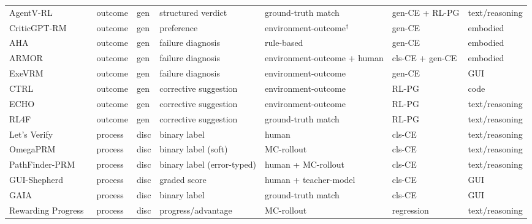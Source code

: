 \begin{table}[htbp]
{\begin{tabular}{@{}lllllll@{}}
AgentV-RL~\cite{Zha26ac}        & outcome & gen  & structured verdict        & ground-truth match                     & gen-CE + RL-PG  & text/reasoning  \\
CriticGPT-RM~\cite{Liu24g}      & outcome & gen  & preference                & environment-outcome$^\dagger$          & gen-CE          & embodied        \\
AHA~\cite{Dua24}                & outcome & gen  & failure diagnosis         & rule-based                             & gen-CE          & embodied        \\
ARMOR~\cite{Qi26}               & outcome & gen  & failure diagnosis         & environment-outcome + human            & cls-CE + gen-CE & embodied        \\
ExeVRM~\cite{Son26d}            & outcome & gen  & failure diagnosis         & environment-outcome                    & gen-CE          & GUI             \\
CTRL~\cite{Xie25c}              & outcome & gen  & corrective suggestion     & environment-outcome                    & RL-PG           & code            \\
ECHO~\cite{Li26l}               & outcome & gen  & corrective suggestion     & environment-outcome                    & RL-PG           & text/reasoning  \\
RL4F~\cite{Aky23}               & outcome & gen  & corrective suggestion     & ground-truth match                     & RL-PG           & text/reasoning  \\
\midrule
Let's Verify~\cite{Lig23}       & process & disc & binary label              & human                                  & cls-CE          & text/reasoning  \\
OmegaPRM~\cite{Luo24}           & process & disc & binary label (soft)       & MC-rollout                             & cls-CE          & text/reasoning  \\
PathFinder-PRM~\cite{Pal25}     & process & disc & binary label (error-typed)& human + MC-rollout                     & cls-CE          & text/reasoning  \\
GUI-Shepherd~\cite{Che25h}      & process & disc & graded score              & human + teacher-model                  & cls-CE          & GUI             \\
GAIA~\cite{Wan26p}              & process & disc & binary label              & ground-truth match                     & cls-CE          & GUI             \\
Rewarding Progress~\cite{Set24} & process & disc & progress/advantage        & MC-rollout                             & regression      & text/reasoning  \\

\end{tabular}}
\end{table}
